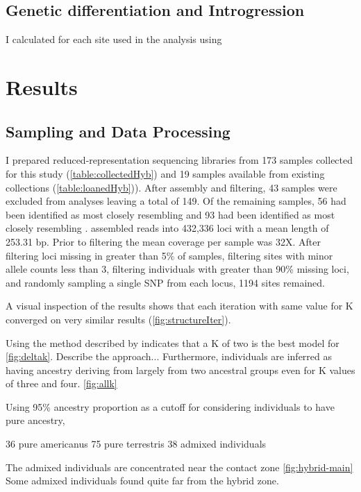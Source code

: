 \subsection{Genetic differentiation and Introgression}
I calculated \fst for each site used in the \bgc analysis using \vcftools  



\section{Results}
\subsection{Sampling and Data Processing}

I prepared reduced-representation sequencing libraries from 173 samples collected 
for this study (\cref{table:collectedHyb}) and 19 samples available from existing 
collections (\cref{table:loanedHyb})). After assembly and filtering, 43 samples
were excluded from analyses leaving a total of 149. 
Of the remaining samples, 56 had been identified 
as most closely resembling \amer and 93 had been identified as most closely
resembling \terr.
\stacks assembled reads into 432,336 loci with a mean length of 253.31 bp.
Prior to filtering the mean coverage per sample was 32X.
After filtering loci missing in greater than 5\% of samples, filtering sites with   
minor allele counts less than 3, filtering individuals with greater than 90\% 
missing loci, and randomly sampling a single SNP from each locus, 1194 sites
remained. 

A visual inspection of the \structure results shows that each iteration with  
same value for K converged on very similar results (\cref{fig:structureIter}). 

Using the method described by \parencite{evanno2005} indicates that a K of two
is the best model for \structure \cref{fig:deltak}.
Describe the approach...
Furthermore, individuals are inferred as having ancestry deriving from largely 
from two ancestral groups even for K values of three and four. \cref{fig:allk} 

Using 95\% ancestry proportion as a cutoff for considering individuals to have
pure ancestry, 

36 pure americanus
75 pure terrestris
38 admixed individuals

The admixed individuals are concentrated near the contact zone \cref{fig:hybrid-main} 
Some admixed individuals found quite far from the hybrid zone.



